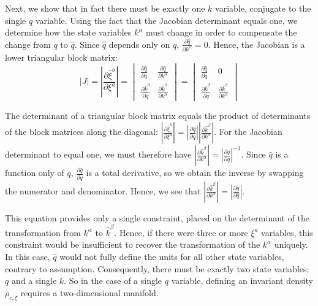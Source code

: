 \documentclass[12pt, english, twoside]{article} %
\begin{document}
Next, we show that in fact there must be exactly one $k$ variable, conjugate to the single $q$ variable. Using the fact that the Jacobian determinant equals one, we determine how the state variables $k^\alpha$ must change in order to compensate the change from $q$ to $\hat q$. Since $\hat{q}$ depends only on $q$, $\frac{\partial \hat{q}}{\partial k^\alpha} = 0$. Hence, the Jacobian is a lower triangular block matrix: 
\begin{equation}
|J| = \left|\frac{\partial \hat{\xi}^b}{\partial \xi^a} \right| = \begin{vmatrix}
\frac{\partial \hat{q}}{\partial q} & \frac{\partial \hat{q}}{\partial k^\alpha} \\
\frac{\partial \hat{k}^\beta}{\partial q} & \frac{\partial \hat{k}^\beta}{\partial  k^\alpha} 
\end{vmatrix} = \begin{vmatrix}
\frac{\partial \hat{q}}{\partial q} & 0 \\
\frac{\partial \hat{k}^\beta}{\partial q} & \frac{\partial \hat{k}^\beta}{\partial  k^\alpha}
\end{vmatrix}
\end{equation}

\noindent
The determinant of a triangular block matrix equals the product of determinants of the block matrices along the diagonal: $ \left|\frac{\partial \hat{\xi}^b}{\partial \xi^a} \right| =  \left|\frac{\partial \hat{q}}{\partial q}\right| \left|\frac{\partial \hat{k}^\beta}{\partial k^\alpha}\right|$. For the Jacobian determinant to equal one, we must therefore have  $\left|\frac{\partial \hat{k}^\beta}{\partial k^\alpha} \right| =   \left|\frac{\partial \hat{q}}{\partial q}\right|^{-1}$. Since $\hat q$ is a function only of $q$, $\frac{\partial \hat{q}}{\partial q}$ is a total derivative, so we obtain the inverse by swapping the numerator and denominator. Hence, we see that $\left|\frac{\partial \hat{k}^\beta}{\partial k^\alpha} \right| = \left|\frac{\partial q}{\partial \hat q} \right|$. 

This equation provides only a single constraint, placed on the determinant of the transformation from $k^\alpha$ to $\hat{k}^\beta$. Hence, if there were three or more $\xi^a$ variables, this constraint would be insufficient to recover the transformation of the $k^\alpha$ uniquely. In this case, $\hat q$  would not fully define the units for all other state variables, contrary to assumption. Consequently, there must be exactly two state variables: $q$ and a single $k$. So in the case of a single $q$ variable, defining an invariant density $\rho_{c, \xi}$ requires a two-dimensional manifold.
\end{document}
